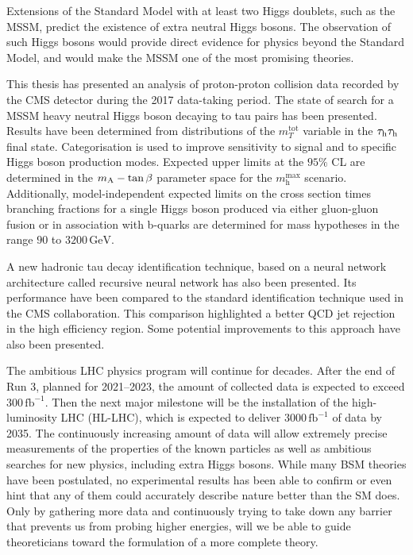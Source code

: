 
Extensions of the Standard Model with at least two Higgs doublets, such as the MSSM, predict the existence of extra neutral Higgs bosons. The observation of such Higgs bosons would provide direct evidence for physics beyond the Standard Model, and would make the MSSM one of the most promising theories. 

This thesis has presented an analysis of proton-proton collision data recorded by the CMS detector during the 2017 data-taking period. The state of search for a MSSM heavy neutral Higgs boson decaying to tau pairs has been presented. Results have been determined from distributions of the $m_{T}^{\mathrm{tot}}$ variable in the $\tau_{\rm h}\tau_{\rm h}$ final state. Categorisation is used to improve sensitivity to signal and to specific Higgs boson production modes. Expected upper limits at the $95\%$ CL are determined in the $m_{\mathrm{A}}-\mathrm{tan}\,\beta$ parameter space for the $m_{\mathrm{h}}^{\mathrm{max}}$ scenario. Additionally, model-independent expected limits on the cross section times branching fractions for a single Higgs boson produced via either gluon-gluon fusion or in association with b-quarks are determined for mass hypotheses in the range $90$ to $3200\,\mathrm{GeV}$.

A new hadronic tau decay identification technique, based on a neural network architecture called recursive neural network has also been presented. Its performance have been compared to the standard identification technique used in the CMS collaboration. This comparison highlighted a better QCD jet rejection in the high \tauh efficiency region. Some potential improvements to this approach have also been presented.

The ambitious LHC physics program will continue for decades. After the end of Run 3, planned for 2021–2023, the amount of collected data is expected to exceed $300\,\mathrm{fb^{-1}}$. Then the next major milestone will be the installation of the high-luminosity LHC (HL-LHC), which is expected to deliver $3000\,\mathrm{fb^{-1}}$ of data by 2035. The continuously increasing amount of data will allow extremely precise measurements of the properties of the known particles as well as ambitious searches for new physics, including extra Higgs bosons. While many BSM theories have been postulated, no experimental results has been able to confirm or even hint that any of them could accurately describe nature better than the SM does. Only by gathering more data and continuously trying to take down any barrier that prevents us from probing higher energies, will we be able to guide theoreticians toward the formulation of a more complete theory.